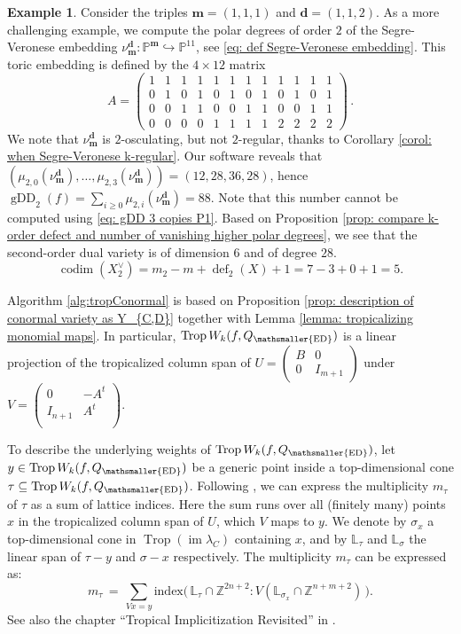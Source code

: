 \documentclass[11pt,reqno]{amsart}
\numberwithin{equation}{section}
\theoremstyle{plain}
\numberwithin{theorem}{section}
\theoremstyle{definition}
\newtheorem{example}[theorem]{Example}
\renewcommand{\P}{\mathbb{P}}
\newcommand{\Z}{\mathbb{Z}}
\def\bd{{\boldsymbol{d}}}
\def\bm{{\boldsymbol{m}}}
\DeclareMathOperator{\Trop}{Trop}
\newcommand{\codim}{\operatorname{codim}}
\newcommand{\defect}{\operatorname{def}}
\newcommand{\gDD}{\operatorname{gDD}}
\newcommand{\image}{\operatorname{im}}
\newcommand{\mED}{\mathsmaller{\mathrm{ED}}}
\begin{document}
\begin{example}\label{ex: polar degrees O(1,1,2) with k=2}
Consider the triples $\bm=(1,1,1)$ and $\bd=(1,1,2)$. As a more challenging example, we compute the polar degrees of order $2$ of the Segre-Veronese embedding $\nu_\bm^\bd\colon\P^\bm\hookrightarrow\P^{11}$, see \eqref{eq: def Segre-Veronese embedding}. This toric embedding is defined by the $4\times 12$ matrix
\[
A = 
\begin{pmatrix}
1& 1& 1& 1& 1& 1& 1& 1& 1& 1& 1& 1\\
0& 1& 0& 1& 0& 1& 0& 1& 0& 1& 0& 1\\
0& 0& 1& 1& 0& 0& 1& 1& 0& 0& 1& 1\\
0& 0& 0& 0& 1& 1& 1& 1& 2& 2& 2& 2
\end{pmatrix}\,.
\]
We note that $\nu_\bm^\bd$ is $2$-osculating, but not $2$-regular, thanks to Corollary \ref{corol: when Segre-Veronese k-regular}.
Our software reveals that $(\mu_{2,0}(\nu_\bm^\bd),\dots,\mu_{2,3}(\nu_\bm^\bd))=(12,28,36,28)$, hence $\gDD_2(f)=\sum_{i\ge 0}\mu_{2,i}(\nu_\bm^\bd)=88$. 
Note that this number cannot be computed using \eqref{eq: gDD 3 copies P1}.
Based on Proposition \ref{prop: compare k-order defect and number of vanishing higher polar degrees}, we see that 
the second-order dual variety is of dimension $6$ and of degree $28$.
$$\codim(X_2^\vee) = m_2-m+\defect_2(X)+1 = 7-3+0+1 = 5.$$
\end{example}



Algorithm \ref{alg:tropConormal} is based on Proposition \ref{prop: description of conormal variety as Y_{C,D}} together with Lemma \ref{lemma: tropicalizing monomial maps}.
In particular, $\Trop W_k(f,Q_\mED)$ is a linear projection of the
tropicalized column span of $U = \begin{pmatrix}
B & 0 \\
0 & I_{m+1}
\end{pmatrix}$ under
$V = \begin{pmatrix}
0 & -A^t \\
I_{n+1} & A^t \\
\end{pmatrix}.$

To describe the underlying weights of $\Trop W_k(f,Q_\mED)$, let $y \in \Trop W_k(f,Q_\mED)$ be a generic point inside a top-dimensional cone $\tau \subseteq \Trop W_k(f,Q_\mED)$. Following \cite[Theorem 3.12]{TevelevSturmfels}, we can express the multiplicity $m_{\tau}$ of $\tau$ as a sum of lattice indices.
Here the sum runs over all (finitely many) points $x$ in the tropicalized column span of $U$, which $V$ maps to $y$. We denote by $\sigma_x$ a top-dimensional cone in $\Trop(\image\lambda_C)$ containing $x$, and by $\mathbb{L}_\tau$ and $\mathbb{L}_\sigma$ the linear span of
$\tau-y$ and $\sigma-x$ respectively.
The multiplicity $ m_{\tau} $ can be expressed as:
\begin{equation*}
 m_{\tau} \, = \,  \sum_{Vx = y} \text{index}
 \bigl(\,\mathbb{L}_\tau \cap \Z^{2n+2} : V(\mathbb{L}_{\sigma_x} \cap \Z^{ n+m+2 })\, \bigr). 
\end{equation*}
See also the chapter ``Tropical Implicitization Revisited'' in \cite{OSCAR-book}.
\end{document}
